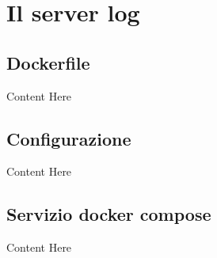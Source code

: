 \documentclass[../DocumentazioneProgetto.tex]{subfiles}
\begin{document}
	\section{Il server log} 
\subsection{Dockerfile} 
Content Here
\subsection{Configurazione} 
Content Here
\subsection{Servizio docker compose} 
Content Here
\end{document}
